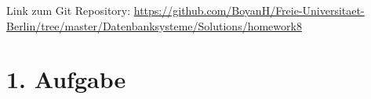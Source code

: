 \usepackage{graphicx}
\usepackage{fancyvrb}

\newcommand{\dozent}{Prof. Dr. Agn`es Voisard, Nicolas Lehmann}					%
\newcommand{\tutor}{Nicolas Lehmann}						%
\newcommand{\tutoriumNo}{10}				%
\newcommand{\projectNo}{8}									%
\newcommand{\veranstaltung}{Datenbanksysteme}	%
\newcommand{\semester}{SoSe 2017}						%
\newcommand{\studenten}{Boyan Hristov, Julian Habib, Gruppe 42}			%




Link zum Git Repository: \url{https://github.com/BoyanH/Freie-Universitaet-Berlin/tree/master/Datenbanksysteme/Solutions/homework\projectNo}


\section*{1. Aufgabe}

